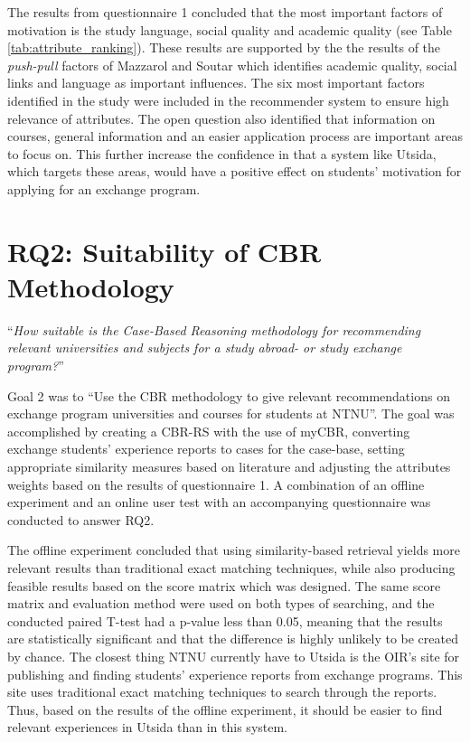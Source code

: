 The results from questionnaire 1 concluded that the most important factors of motivation is the study language, social quality and academic quality (see Table \ref{tab:attribute_ranking}). These results are supported by the the results of the \emph{push-pull} factors of Mazzarol and Soutar \cite{mazzarol2002push} which identifies academic quality, social links and language as important influences. The six most important factors identified in the study were included in the recommender system to ensure high relevance of attributes. The open question also identified that information on courses, general information and an easier application process are important areas to focus on. This further increase the confidence in that a system like Utsida, which targets these areas, would have a positive effect on students' motivation for applying for an exchange program.

\section{RQ2: Suitability of CBR Methodology}

\enquote{\textit{How suitable is the Case-Based Reasoning methodology for recommending relevant universities and subjects for a study abroad- or study exchange program?}}

Goal 2 was to \enquote{Use the CBR methodology to give relevant recommendations on exchange program universities and courses for students at NTNU}. The goal was accomplished by creating a CBR-RS with the use of myCBR, converting exchange students' experience reports to cases for the case-base, setting appropriate similarity measures based on literature and adjusting the attributes weights based on the results of questionnaire 1. A combination of an offline experiment and an online user test with an accompanying questionnaire was conducted to answer RQ2. 

The offline experiment concluded that using similarity-based retrieval yields more relevant results than traditional exact matching techniques, while also producing feasible results based on the score matrix which was designed. The same score matrix and evaluation method were used on both types of searching, and the conducted paired T-test had a p-value less than 0.05, meaning that the results are statistically significant and that the difference is highly unlikely to be created by chance. The closest thing NTNU currently have to Utsida is the OIR's site for publishing and finding students' experience reports from exchange programs. This site uses traditional exact matching techniques to search through the reports. Thus, based on the results of the offline experiment, it should be easier to find relevant experiences in Utsida than in this system. 

